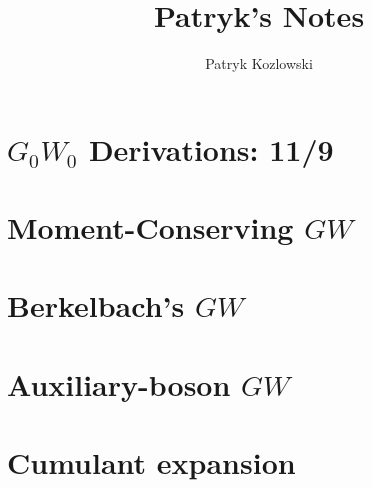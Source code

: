 \documentclass[12pt]{report}
\title{Patryk's Notes}
\author{Patryk Kozlowski}
\begin{document}
\setcounter{tocdepth}{3}  %
\tableofcontents
\clearpage  %

\maketitle

\chapter{$G_0W_0$ Derivations: 11/9}

% 
% 
\chapter{Moment-Conserving $GW$}

\chapter{Berkelbach's $GW$}

\chapter{Auxiliary-boson $GW$}

\chapter{Cumulant expansion}

% 
% 
% 




% 


\end{document}
